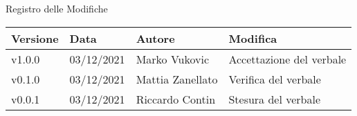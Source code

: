 \begin{center}
  \huge{Registro delle Modifiche}
\end{center}

\begin{center}
  \begin{tabular}{|p{2cm}|p{2cm}|p{3cm}|p{5cm}|}
    \hline
    \textbf{Versione} & \textbf{Data} & \textbf{Autore} & \textbf{Modifica}                    \\ \hline
    v1.0.0            & 03/12/2021    & Marko Vukovic   & Accettazione del verbale \\ \hline
    v0.1.0            & 03/12/2021    & Mattia Zanellato   & Verifica del verbale \\ \hline
    v0.0.1            & 03/12/2021    & Riccardo Contin    & Stesura del verbale \\ \hline
  \end{tabular}
\end{center}